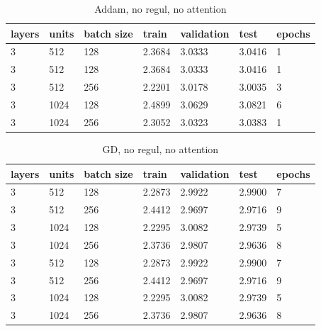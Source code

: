 \documentclass[12pt]{article}\pagestyle{myheadings}
\begin{document}
\begin{table}[]
\centering
\caption{Addam, no regul, no attention}
\label{my-label}
\begin{tabular}{|l|l|l|l|l|l|l|}
\hline
layers  & units & batch size   & train & validation & test & epochs \\ \hline
3 & 512  & 128 &   2.3684    &    3.0333        &    3.0416  &   1     \\ \hline
3 & 512  & 128 &   2.3684    &    3.0333        &    3.0416  &   1     \\ \hline
3 & 512  & 256 &   2.2201    &    3.0178        &    3.0035  &   3     \\ \hline
3 & 1024  & 128 &   2.4899    &    3.0629        &    3.0821  &   6     \\ \hline
3 & 1024  & 256 &   2.3052    &    3.0323        &    3.0383  &   1     \\ \hline
\hline
\end{tabular}
\end{table}

\begin{table}[]
\centering
\caption{GD, no regul, no attention}
\label{my-label}
\begin{tabular}{|l|l|l|l|l|l|l|}
\hline
layers  & units & batch size   & train & validation & test & epochs \\ \hline
3 & 512  & 128 &   2.2873    &    2.9922        &    2.9900  &   7     \\ \hline
3 & 512  & 256 &   2.4412    &    2.9697        &    2.9716  &   9     \\ \hline
3 & 1024  & 128 &   2.2295    &    3.0082        &    2.9739  &   5     \\ \hline
3 & 1024  & 256 &   2.3736    &    2.9807        &    2.9636  &   8     \\ \hline
3 & 512  & 128 &   2.2873    &    2.9922        &    2.9900  &   7     \\ \hline
3 & 512  & 256 &   2.4412    &    2.9697        &    2.9716  &   9     \\ \hline
3 & 1024  & 128 &   2.2295    &    3.0082        &    2.9739  &   5     \\ \hline
3 & 1024  & 256 &   2.3736    &    2.9807        &    2.9636  &   8     \\ \hline
\hline
\end{tabular}
\end{table}
\end{document}
